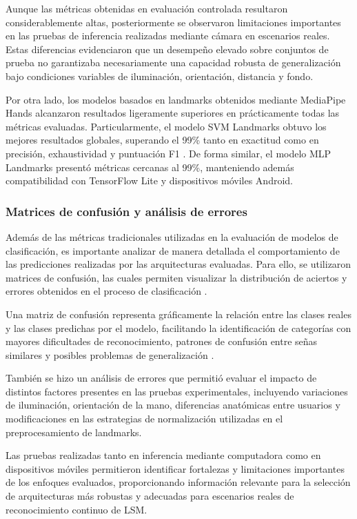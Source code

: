 	Aunque las métricas obtenidas en evaluación controlada resultaron considerablemente altas, posteriormente se observaron limitaciones importantes en las pruebas de inferencia realizadas mediante cámara en escenarios reales. Estas diferencias evidenciaron que un desempeño elevado sobre conjuntos de prueba no garantizaba necesariamente una capacidad robusta de generalización bajo condiciones variables de iluminación, orientación, distancia y fondo.
	
	Por otra lado, los modelos basados en landmarks obtenidos mediante MediaPipe Hands alcanzaron resultados ligeramente superiores en prácticamente todas las métricas evaluadas. Particularmente, el modelo SVM Landmarks obtuvo los mejores resultados globales, superando el 99\% tanto en exactitud como en precisión, exhaustividad y puntuación F1 \cite{goodfellow2016deep}. De forma similar, el modelo MLP Landmarks presentó métricas cercanas al 99\%, manteniendo además compatibilidad con TensorFlow Lite y dispositivos móviles Android.
	

	
	\subsubsection{Matrices de confusión y análisis de errores}
	
	Además de las métricas tradicionales utilizadas en la evaluación de modelos de clasificación, es importante analizar de manera detallada el comportamiento de las predicciones realizadas por las arquitecturas evaluadas. Para ello, se utilizaron matrices de confusión, las cuales permiten visualizar la distribución de aciertos y errores obtenidos en el proceso de clasificación \cite{goodfellow2016deep,geron2022hands}.
	
	Una matriz de confusión representa gráficamente la relación entre las clases reales y las clases predichas por el modelo, facilitando la identificación de categorías con mayores dificultades de reconocimiento, patrones de confusión entre señas similares y posibles problemas de generalización \cite{chollet2021deep}.
	
	También se hizo un análisis de errores que permitió evaluar el impacto de distintos factores presentes en las pruebas experimentales, incluyendo variaciones de iluminación, orientación de la mano, diferencias anatómicas entre usuarios y modificaciones en las estrategias de normalización utilizadas en el preprocesamiento de landmarks.
	
	Las pruebas realizadas tanto en inferencia mediante computadora como en dispositivos móviles permitieron identificar fortalezas y limitaciones importantes de los enfoques evaluados, proporcionando información relevante para la selección de arquitecturas más robustas y adecuadas para escenarios reales de reconocimiento continuo de LSM.
	
